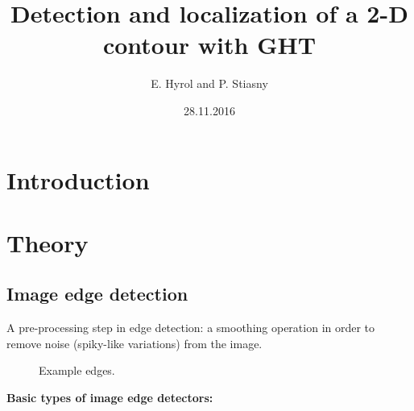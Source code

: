 \documentclass[letterpaper,12pt]{article}
\begin{document}
\title{Detection and localization of a 2-D contour with GHT}
\author{E. Hyrol and P. Stiasny}
\date{28.11.2016}
\maketitle

\begin{abstract}

\end{abstract}


\section{Introduction}


\section{Theory}

\subsection{Image edge detection}

A pre-processing step in edge detection: a smoothing operation in order to remove noise (spiky-like variations) from the image.


\begin{figure}[!th]
  \centering
  \hfill
  \caption{Example edges.}
\end{figure}

\textbf{Basic types of image edge detectors: }
\end{document}
